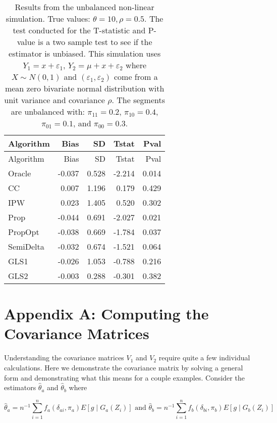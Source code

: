 \documentclass[
  letterpaper,
  DIV=11,
  numbers=noendperiod]{scrartcl}
\begin{document}
\begin{longtable}[]{@{}lrrrr@{}}
\caption{Results from the unbalanced non-linear simulation. True values:
\(\theta = 10, \rho = 0.5\). The test conducted for the T-statistic and
P-value is a two sample test to see if the estimator is unbiased. This
simulation uses \(Y_1 = x + \varepsilon_1\),
\(Y_2 = \mu + x + \varepsilon_2\) where \(X \sim N(0, 1)\) and
\((\varepsilon_1, \varepsilon_2)\) come from a mean zero bivariate
normal distribution with unit variance and covariance \(\rho\). The
segments are unbalanced with: \(\pi_{11} = 0.2\), \(\pi_{10} = 0.4\),
\(\pi_{01} = 0.1\), and \(\pi_{00} = 0.3\). }\tabularnewline
\toprule\noalign{}
Algorithm & Bias & SD & Tstat & Pval \\
\midrule\noalign{}
\endfirsthead
\toprule\noalign{}
Algorithm & Bias & SD & Tstat & Pval \\
\midrule\noalign{}
\endhead
\bottomrule\noalign{}
\endlastfoot
Oracle & -0.037 & 0.528 & -2.214 & 0.014 \\
CC & 0.007 & 1.196 & 0.179 & 0.429 \\
IPW & 0.023 & 1.405 & 0.520 & 0.302 \\
Prop & -0.044 & 0.691 & -2.027 & 0.021 \\
PropOpt & -0.038 & 0.669 & -1.784 & 0.037 \\
SemiDelta & -0.032 & 0.674 & -1.521 & 0.064 \\
GLS1 & -0.026 & 1.053 & -0.788 & 0.216 \\
GLS2 & -0.003 & 0.288 & -0.301 & 0.382 \\
\end{longtable}

\hypertarget{appendix-a-computing-the-covariance-matrices}{%
\section{Appendix A: Computing the Covariance
Matrices}\label{appendix-a-computing-the-covariance-matrices}}

Understanding the covariance matrices \(V_1\) and \(V_2\) require quite
a few individual calculations. Here we demonstrate the covariance matrix
by solving a general form and demonstrating what this means for a couple
examples. Consider the estimators \(\hat \theta_a\) and
\(\hat \theta_b\) where

\[
\hat \theta_a = n^{-1} \sum_{i = 1}^n f_a(\delta_{ai}, \pi_a) E[g \mid G_a(Z_i)] 
\text{ and }
\hat \theta_b = n^{-1} \sum_{i = 1}^n f_b(\delta_{bi}, \pi_b) E[g \mid G_b(Z_i)] 
\]
\end{document}
